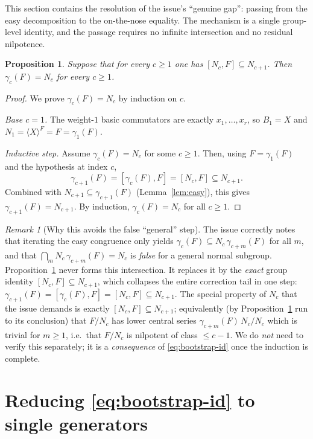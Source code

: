 \documentclass{amsart}
\newtheorem{proposition}{Proposition}
\theoremstyle{definition}
\theoremstyle{remark}
\newtheorem{remark}{Remark}
\begin{document}
This section contains the resolution of the issue's ``genuine gap'': passing from
the easy decomposition to the on-the-nose equality. The mechanism is a single
group-level identity, and the passage requires no infinite intersection and no
residual nilpotence.

\begin{proposition}\label{prop:bootstrap}
Suppose that for every $c\ge1$ one has $[N_c,F]\subseteq N_{c+1}$. Then
$\gamma_c(F)=N_c$ for every $c\ge1$.
\end{proposition}

\begin{proof}
We prove $\gamma_c(F)=N_c$ by induction on $c$.

\emph{Base $c=1$.} The weight-$1$ basic commutators are exactly $x_1,\dots,x_r$,
so $B_1=X$ and $N_1=\langle X\rangle^{F}=F=\gamma_1(F)$.

\emph{Inductive step.} Assume $\gamma_c(F)=N_c$ for some $c\ge1$. Then, using
$F=\gamma_1(F)$ and the hypothesis at index $c$,
\[
\gamma_{c+1}(F)=[\gamma_c(F),F]=[N_c,F]\subseteq N_{c+1}.
\]
Combined with $N_{c+1}\subseteq\gamma_{c+1}(F)$ (Lemma~\ref{lem:easy}), this gives
$\gamma_{c+1}(F)=N_{c+1}$. By induction, $\gamma_c(F)=N_c$ for all $c\ge1$.
\end{proof}

\begin{remark}[Why this avoids the false ``general'' step]
The issue correctly notes that iterating the easy congruence only yields
$\gamma_c(F)\subseteq N_c\,\gamma_{c+m}(F)$ for all $m$, and that
$\bigcap_m N_c\,\gamma_{c+m}(F)=N_c$ is \emph{false} for a general normal
subgroup. Proposition~\ref{prop:bootstrap} never forms this intersection. It
replaces it by the \emph{exact} group identity $[N_c,F]\subseteq N_{c+1}$, which
collapses the entire correction tail in one step:
$\gamma_{c+1}(F)=[\gamma_c(F),F]=[N_c,F]\subseteq N_{c+1}$. The special property of
$N_c$ that the issue demands is exactly $[N_c,F]\subseteq N_{c+1}$; equivalently
(by Proposition~\ref{prop:bootstrap} run to its conclusion) that $F/N_c$ has lower
central series $\gamma_{c+m}(F)\,N_c/N_c$ which is trivial for $m\ge1$, i.e.\ that
$F/N_c$ is nilpotent of class $\le c-1$. We do \emph{not} need to verify this
separately; it is a \emph{consequence} of \eqref{eq:bootstrap-id} once the
induction is complete.
\end{remark}

\section{Reducing \eqref{eq:bootstrap-id} to single generators}\label{sec:reduce}
\end{document}
